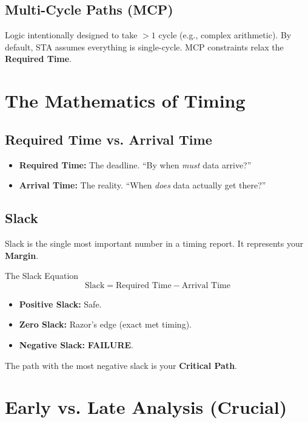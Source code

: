\documentclass[11pt, a4paper]{article}
\begin{document}
\subsection{Multi-Cycle Paths (MCP)}
Logic intentionally designed to take $>1$ cycle (e.g., complex arithmetic). By default, STA assumes everything is single-cycle. MCP constraints relax the \textbf{Required Time}.

\section{The Mathematics of Timing}

\subsection{Required Time vs. Arrival Time}
\begin{itemize}
    \item \textbf{Required Time:} The deadline. ``By when \textit{must} data arrive?''
    \item \textbf{Arrival Time:} The reality. ``When \textit{does} data actually get there?''
\end{itemize}

\subsection{Slack}
Slack is the single most important number in a timing report. It represents your \textbf{Margin}.

\begin{eqbox}{The Slack Equation}
\[ \text{Slack} = \text{Required Time} - \text{Arrival Time} \]
\end{eqbox}

\begin{itemize}
    \item \textbf{Positive Slack:} Safe.
    \item \textbf{Zero Slack:} Razor's edge (exact met timing).
    \item \textbf{Negative Slack:} \textcolor{alertred}{\textbf{FAILURE}}.
\end{itemize}

The path with the most negative slack is your \textbf{Critical Path}.

\section{Early vs. Late Analysis (Crucial)}
\end{document}
